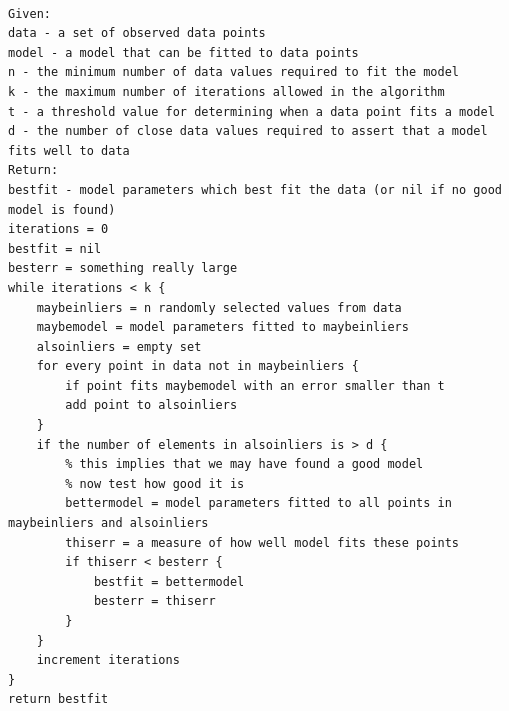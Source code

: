 \begin{lstlisting}

Given:
data - a set of observed data points
model - a model that can be fitted to data points
n - the minimum number of data values required to fit the model
k - the maximum number of iterations allowed in the algorithm
t - a threshold value for determining when a data point fits a model
d - the number of close data values required to assert that a model fits well to data
Return:
bestfit - model parameters which best fit the data (or nil if no good model is found)
iterations = 0
bestfit = nil
besterr = something really large
while iterations < k {
	maybeinliers = n randomly selected values from data
	maybemodel = model parameters fitted to maybeinliers
	alsoinliers = empty set
	for every point in data not in maybeinliers {
		if point fits maybemodel with an error smaller than t
		add point to alsoinliers
	}
	if the number of elements in alsoinliers is > d {
		% this implies that we may have found a good model
		% now test how good it is
		bettermodel = model parameters fitted to all points in maybeinliers and alsoinliers
		thiserr = a measure of how well model fits these points
		if thiserr < besterr {
			bestfit = bettermodel
			besterr = thiserr
		}
	}
	increment iterations
}
return bestfit


\end{lstlisting}